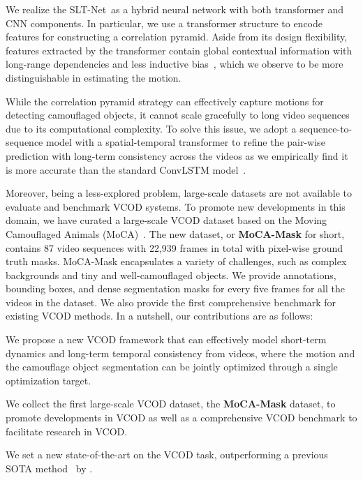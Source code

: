 \documentclass[10pt,twocolumn,letterpaper]{article}
\def\Ourmodel{SLT-Net}
\begin{document}
We realize the \Ourmodel~as a hybrid neural network with both transformer and CNN components. In particular, we use a transformer structure to encode features for constructing a correlation pyramid. Aside from its design flexibility, features extracted by the transformer contain global contextual information with long-range dependencies and less inductive bias~\cite{wang2021pyramid,zhen2022cosformer}, which we observe to be more distinguishable in estimating the motion.

While the correlation pyramid strategy can effectively capture motions for detecting camouflaged objects, it cannot scale gracefully to long video sequences due to its computational complexity. To solve this issue, we adopt a sequence-to-sequence model with a spatial-temporal transformer to refine the pair-wise prediction with long-term consistency across the videos as we empirically find it is more accurate than the standard ConvLSTM model~\cite{xingjian2015convolutional,Zhong_2018_ECCV}. 

Moreover, being a less-explored problem, large-scale datasets are not available to evaluate and benchmark VCOD systems. To promote new developments in this domain, we have curated a large-scale VCOD dataset based on the Moving Camouflaged Animals (MoCA)~\cite{lamdouar2020betrayed}. The new dataset, or \textbf{MoCA-Mask} for short, contains 87 video sequences with 22,939 frames in total with pixel-wise ground truth masks. MoCA-Mask encapsulates a variety of challenges, such as complex backgrounds and tiny and well-camouflaged objects. We provide annotations, bounding boxes, and dense segmentation masks for every five
frames for all the videos in the dataset. 
We also provide the first comprehensive benchmark for existing VCOD methods. 
In a nutshell, our contributions are as follows:
\begin{compactitem}
\item We propose a new VCOD framework that can effectively model short-term dynamics and long-term temporal consistency from videos, where the motion and the camouflage object segmentation can be jointly optimized through a single optimization target. 
\item We collect the first large-scale VCOD dataset, the \textbf{MoCA-Mask} dataset, to promote developments in VCOD as well as a comprehensive VCOD benchmark to facilitate research in VCOD.
\item We set a new state-of-the-art on the VCOD task, outperforming a previous SOTA method~\cite{yan2019semi} by .\end{compactitem}
\end{document}
